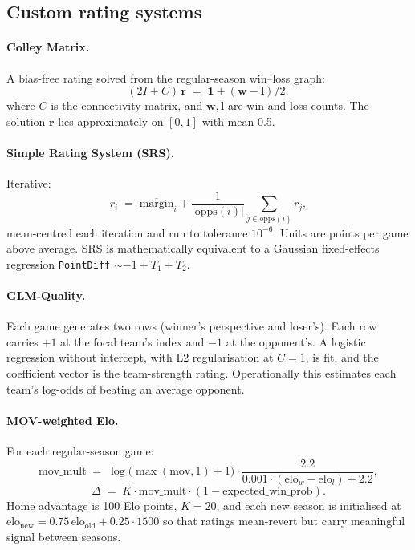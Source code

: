 \documentclass[11pt, a4paper]{article}
\begin{document}
\subsection{Custom rating systems}

\paragraph{Colley Matrix.} A bias-free rating solved from the regular-season win--loss graph:
\begin{equation}
    (2I + C)\,\mathbf{r} \;=\; \mathbf{1} + (\mathbf{w} - \mathbf{l})/2,
\end{equation}
where $C$ is the connectivity matrix, and $\mathbf{w}, \mathbf{l}$ are win and loss counts. The solution $\mathbf{r}$ lies approximately on $[0, 1]$ with mean 0.5.

\paragraph{Simple Rating System (SRS).} Iterative:
\begin{equation}
    r_i \;=\; \overline{\text{margin}}_i + \frac{1}{|\text{opps}(i)|}\sum_{j \in \text{opps}(i)} r_j,
\end{equation}
mean-centred each iteration and run to tolerance $10^{-6}$. Units are points per game above average. SRS is mathematically equivalent to a Gaussian fixed-effects regression \texttt{PointDiff} $\sim -1 + T_1 + T_2$.

\paragraph{GLM-Quality.} Each game generates two rows (winner's perspective and loser's). Each row carries $+1$ at the focal team's index and $-1$ at the opponent's. A logistic regression without intercept, with L2 regularisation at $C = 1$, is fit, and the coefficient vector is the team-strength rating. Operationally this estimates each team's log-odds of beating an average opponent.

\paragraph{MOV-weighted Elo.} For each regular-season game:
\begin{equation}
    \text{mov\_mult} \;=\; \log\!\bigl(\max(\text{mov},1) + 1\bigr) \cdot \frac{2.2}{0.001 \cdot (\text{elo}_w - \text{elo}_l) + 2.2},
\end{equation}
\begin{equation}
    \Delta \;=\; K \cdot \text{mov\_mult} \cdot (1 - \text{expected\_win\_prob}).
\end{equation}
Home advantage is 100 Elo points, $K = 20$, and each new season is initialised at $\text{elo}_{\text{new}} = 0.75\,\text{elo}_{\text{old}} + 0.25 \cdot 1500$ so that ratings mean-revert but carry meaningful signal between seasons.
\end{document}
